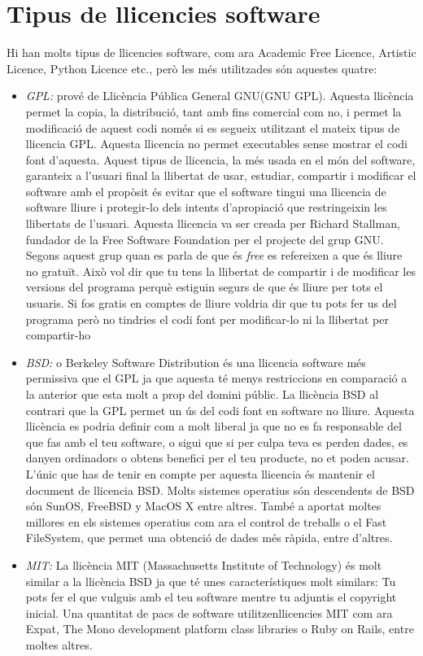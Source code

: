 \section{Tipus de llicencies software}
Hi han molts tipus de llicencies software, com ara Academic Free Licence, Artistic Licence, Python Licence etc., però les més utilitzades són aquestes quatre:
\begin{itemize}
\item \emph{GPL:} prové de Llicència Pública General GNU(GNU GPL). Aquesta llicència permet la copia, la distribució, tant amb fins comercial com no, i permet la modificació de aquest codi només si es segueix utilitzant el mateix tipus de llicencia GPL. Aquesta llicencia no permet executables sense mostrar el codi font d'aquesta. Aquest tipus de llicencia, la més usada en el món del software, garanteix a l'usuari final la llibertat de usar, estudiar, compartir i modificar el software amb el propòsit és evitar que el software tingui una llicencia de software lliure i protegir-lo dels intents d'apropiació que restringeixin les llibertats de l'usuari. Aquesta llicencia va ser creada per Richard Stallman, fundador de la Free Software Foundation per el projecte del grup GNU.
Segons aquest grup quan es parla de que és \textit{free} es refereixen a que és lliure no gratuït. Això vol dir que tu tens la llibertat de compartir i de modificar les versions del programa perquè estiguin segurs	de que és lliure per tots el usuaris. Si fos gratis en comptes de lliure voldria dir que tu pots fer us del programa però no tindries el codi font per modificar-lo ni la llibertat per compartir-ho
\item \emph{BSD:} o Berkeley Software Distribution és una llicencia software més permissiva que el GPL ja que aquesta té menys restriccions en comparació a la anterior que esta molt a prop del domini públic. La llicència BSD al contrari que la GPL permet un ús del codi font en software no lliure. Aquesta llicència es podria definir com a molt liberal ja que no es fa responsable del que fas amb el teu software, o sigui que si per culpa teva es perden dades, es danyen ordinadors o obtens benefici per el teu producte, no et poden acusar. L'únic que has de tenir en compte per aquesta llicencia és mantenir el document de llicencia BSD. Molts sistemes operatius són descendents de BSD són SunOS, FreeBSD y MacOS X entre altres. També a aportat moltes millores en els sistemes operatius com ara el control de treballs o el Fast FileSystem, que permet una obtenció de dades més ràpida, entre d'altres.
\item \emph{MIT:} La llicència MIT (Massachusetts Institute of Technology) és molt similar a la llicència BSD ja que té unes característiques molt similars: Tu pots fer el que vulguis amb el teu software mentre tu adjuntis el copyright inicial. Una quantitat de pacs de software utilitzenllicencies MIT com ara Expat, The Mono development platform class libraries o Ruby on Rails, entre moltes altres.

\end{itemize}
